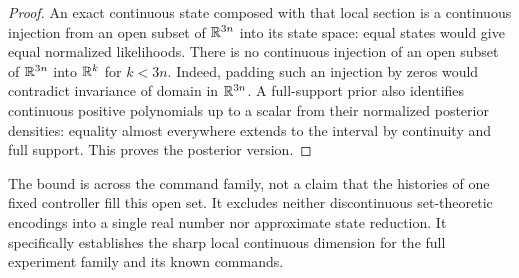 \begin{proof}
An exact continuous state composed with that local section is a continuous
injection from an open subset of $\mathbb R^{3n}$ into its state space: equal states
would give equal normalized likelihoods. There is no continuous injection
of an open subset of $\mathbb R^{3n}$ into $\mathbb R^k$ for $k<3n$. Indeed, padding such
an injection by zeros would contradict invariance of domain in
$\mathbb R^{3n}$. A full-support prior also identifies continuous positive
polynomials up to a scalar from their normalized posterior densities:
equality almost everywhere extends to the interval by continuity and full
support. This proves the posterior version.
\end{proof}

The bound is across the command family, not a claim that the histories of
one fixed controller fill this open set. It excludes neither discontinuous
set-theoretic encodings into a single real number nor approximate state
reduction. It specifically establishes the sharp local continuous dimension
for the full experiment family and its known commands.

